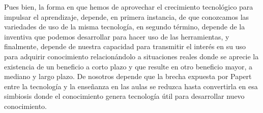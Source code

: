 Pues bien, la forma en que hemos de aprovechar el crecimiento tecnológico para impulsar el aprendizaje, depende, en primera instancia, de que conozcamos las variedades de uso de la misma tecnología, en segundo término, depende de la inventiva que podemos desarrollar para hacer uso de las herramientas, y finalmente, depende de nuestra capacidad para transmitir el interés en su uso para adquirir conocimiento relacionándolo a situaciones reales donde se aprecie la existencia de un beneficio a corto plazo y que resulte en otro beneficio mayor, a mediano y largo plazo. De nosotros depende que la brecha expuesta por Papert entre la tecnología y la enseñanza en las aulas se reduzca hasta convertirla en esa simbiosis donde el conocimiento genera tecnología útil para desarrollar nuevo conocimiento.
